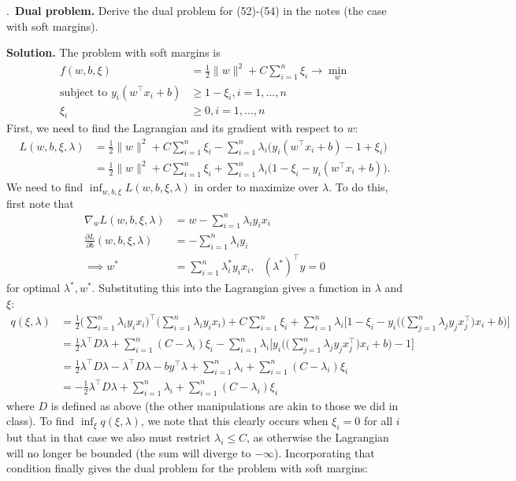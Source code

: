 \documentclass{letter}
\newcounter{problem}
\newcommand{\Problem}[2]{%
	\stepcounter{problem}%
	\leftskip=0pt%
	\theproblem.~\textbf{{#1.}} #2 \par%
}
\newcommand{\Solution}[1]{%
	\textbf{Solution.} #1 \par%
}
\newcommand{\T}{\intercal}
\begin{document}
    \Problem{Dual problem}{Derive the dual problem for (52)-(54) in the notes (the case with soft margins).}
    \Solution{The problem with soft margins is \begin{align*}
        f(w, b, \xi) &= \frac{1}{2}\|w\|^2 + C\sum_{i=1}^n \xi_i \rightarrow \min_w \\
        \text{subject to } y_i(w^\T x_i + b) &\geq 1 - \xi_i, i = 1, \dots, n \\
        \xi_i &\geq 0, i = 1, \dots, n
    \end{align*} First, we need to find the Lagrangian and its gradient with respect to $w$: \begin{align*}
        L(w,b,\xi,\lambda) &= \frac{1}{2}\|w\|^2 + C\sum_{i=1}^n \xi_i - \sum_{i=1}^n \lambda_i \big(y_i(w^\T x_i + b) - 1 + \xi_i\big) \\
        &= \frac{1}{2}\|w\|^2 + C\sum_{i=1}^n \xi_i + \sum_{i=1}^n \lambda_i\big(1 - \xi_i - y_i(w^\T x_i + b)\big).
    \end{align*} We need to find $\inf_{w,b,\xi} L(w,b,\xi,\lambda)$ in order to maximize over $\lambda$. To do this, first note that \begin{align*}
        \nabla_w L(w,b,\xi,\lambda) &= w - \sum_{i=1}^n \lambda_i y_i x_i \\
        \frac{\partial L}{\partial b}(w,b,\xi,\lambda) &= -\sum_{i=1}^n \lambda_i y_i \\
        \implies w^* &= \sum_{i=1}^n \lambda_i^* y_i x_i, \text{ } (\lambda^*)^\T y = 0
    \end{align*} for optimal $\lambda^*, w^*$. Substituting this into the Lagrangian gives a function in $\lambda$ and $\xi$: \begin{align*}
        q(\xi, \lambda) &= \frac{1}{2}\Big(\sum_{i=1}^n \lambda_i y_i x_i\Big)^\T\Big(\sum_{i=1}^n \lambda_i y_i x_i\Big) + C\sum_{i=1}^n \xi_i + \sum_{i=1}^n \lambda_i\Big[1 - \xi_i - y_i\Big(\Big(\sum_{j=1}^n \lambda_j y_j x_j^\T\Big)x_i + b\Big)\Big] \\
        &= \frac{1}{2}\lambda^\T D \lambda + \sum_{i=1}^n(C - \lambda_i)\xi_i - \sum_{i=1}^n \lambda_i \Big[y_i\Big(\Big(\sum_{j=1}^n \lambda_j y_j x_j^\T\Big)x_i + b\Big) - 1\Big] \\
        &= \frac{1}{2}\lambda^\T D \lambda - \lambda^\T D \lambda - by^\T \lambda + \sum_{i=1}^n \lambda_i + \sum_{i=1}^n (C-\lambda_i)\xi_i \\
        &= -\frac{1}{2}\lambda^\T D \lambda + \sum_{i=1}^n \lambda_i + \sum_{i=1}^n (C - \lambda_i)\xi_i
    \end{align*} where $D$ is defined as above (the other manipulations are akin to those we did in class). To find $\inf_\xi q(\xi,\lambda)$, we note that this clearly occurs when $\xi_i = 0$ for all $i$ but that in that case we also must restrict $\lambda_i \leq C$, as otherwise the Lagrangian will no longer be bounded (the sum will diverge to $-\infty$). Incorporating that condition finally gives the dual problem for the problem with soft margins: \begin{align*}

\end{align*}}
\end{document}
